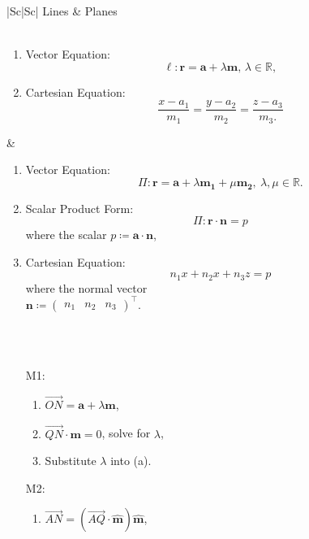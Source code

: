 \documentclass[oneside]{book}
\begin{document}
\begin{longtable}{|Sc|Sc|}
  \hline
  Lines & Planes\\
  \hline
  \\
  \hline
  \begin{minipage}{0.4\linewidth}
    \begin{enumerate}
      \item Vector Equation: \[\ell \colon \mathbf{r}=\mathbf{a}+\lambda \mathbf{m}\text{, }\lambda \in \mathbb{R},\]
      \item Cartesian Equation: 
      \[\frac{x-a_1}{m_1}=\frac{y-a_2}{m_2}=\frac{z-a_3}{m_3.}\]
    \end{enumerate}
\end{minipage} & 
\begin{minipage}{0.4\linewidth}
\begin{enumerate}
  \item Vector Equation: 
  \[\Pi \colon \mathbf{r}=\mathbf{a}+\lambda
  \mathbf{m_1}+\mu \mathbf{m_2},\ \lambda,\mu\in\mathbb{R}.\]
  \item Scalar Product Form: 
  \[\Pi \colon \mathbf{r} \cdot \mathbf{n}=p\]
  where the scalar \(p\coloneq  \mathbf{a}\cdot \mathbf{n}\),
  \item Cartesian Equation:
  \[n_1x+n_2x+n_3z=p\]
  where the normal vector\\
  \(\mathbf{n}\coloneq \begin{pmatrix}
    n_1 & n_2 & n_3
  \end{pmatrix}^\top\).
\end{enumerate}
\end{minipage}\\
\hline
{}\\
\hline
\begin{minipage}{0.4\linewidth}
  \begin{enumerate}
    \item[M1:] 
    \begin{enumerate}
      \item \(\overrightarrow{ON}=\mathbf{a}+\lambda \mathbf{m}\),
      \item \(\overrightarrow{QN} \cdot \mathbf{m}=0\), solve for \(\lambda\),
      \item Substitute \(\lambda\) into (a).
    \end{enumerate}
    \item[M2:] 
    \begin{enumerate}
      \item \(\overrightarrow{AN}=\left(\overrightarrow{AQ} \cdot \mathbf{\widehat{m}}\right)\mathbf{\widehat{m}}\),

\end{enumerate}
\end{enumerate}
\end{minipage}
\end{longtable}
\end{document}

